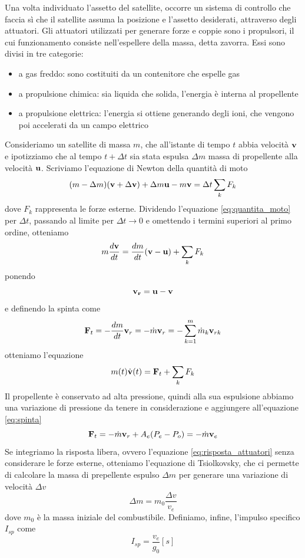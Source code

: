 Una volta individuato l'assetto del satellite, occorre un sistema di controllo
che faccia sì che il satellite assuma la posizione e l'assetto desiderati,
attraverso degli attuatori.
Gli attuatori utilizzati per generare forze e coppie sono i propulsori, il cui
funzionamento consiste nell'espellere della massa, detta zavorra.
Essi sono divisi in tre categorie:
\begin{itemize}
  \item a gas freddo: sono costituiti da un contenitore che espelle gas
  \item a propulsione chimica: sia liquida che solida, l'energia è interna al
  propellente
  \item a propulsione elettrica: l'energia si ottiene generando degli ioni, che
  vengono poi accelerati da un campo elettrico
\end{itemize}
Consideriamo un satellite di massa $m$, che all'istante di tempo $t$ abbia
velocità ${\bf v}$ e ipotizziamo che al tempo $t+\Delta t$ sia stata espulsa
$\Delta m$ massa di propellente alla velocità ${\bf u}$. Scriviamo l'equazione
di Newton della quantità di moto
\begin{equation}
(m-\Delta m)({\bf v}+\Delta{\bf v})+\Delta m{\bf u}-m{\bf v}=\Delta t\sum_k F_k
\label{eq:quantita_moto}
\end{equation}
dove $F_k$ rappresenta le forze esterne.
Dividendo l'equazione \ref{eq:quantita_moto} per $\Delta t$, passando al limite
per $\Delta t\rightarrow 0$ e omettendo i termini superiori al primo ordine,
otteniamo
\begin{equation}
m\frac{d{\bf v}}{dt}=\frac{dm}{dt}({\bf v-u})+\sum_k F_k
\end{equation}
ponendo \[ {\bf v_r}={\bf u-v} \] e definendo la spinta come
\begin{equation}
{\bf F}_t=-\frac{dm}{dt}{\bf v}_r=-\dot{m}{\bf v}_r=-\sum_{k=1}^m
\dot{m}_k{\bf v}_{rk}
\label{eq:spinta}
\end{equation}
otteniamo l'equazione
\begin{equation}
m(t)\dot{\bf v}(t)={\bf F}_t+\sum_k F_k
\label{eq:risposta_attuatori}
\end{equation}
Il propellente è conservato ad alta pressione, quindi alla sua espulsione
abbiamo una variazione di pressione da tenere in considerazione e aggiungere
all'equazione \ref{eq:spinta}
\begin{equation}
{\bf F}_t=-\dot{m}{\bf v}_r+A_e(P_e-P_o)=-\dot{m}{\bf v}_e
\end{equation}
Se integriamo la risposta libera, ovvero l'equazione \ref{eq:risposta_attuatori}
senza considerare le forze esterne, otteniamo l'equazione di Tsiolkovsky, che ci
permette di calcolare la massa di prepellente espulso $\Delta m$ per generare
una variazione di velocità $\Delta v$
\begin{equation}
\Delta m=m_0\frac{\Delta v}{v_e}
\end{equation}
dove $m_0$ è la massa iniziale del combustibile. Definiamo, infine, l'impulso
specifico $I_{sp}$ come \[ I_{sp}=\frac{v_e}{g_0}[s] \]

